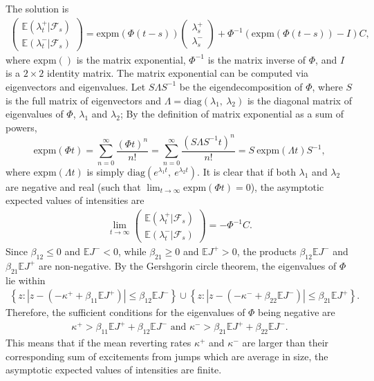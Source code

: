 \documentclass[11pt,a4paper]{article}
\numberwithin{equation}{section}
\theoremstyle{remark}
\theoremstyle{definition}
\newcommand{\E}{{\mathbb{E}}}
\begin{document}
The solution is
\begin{align*}
\begin{pmatrix}
  \E(\lambda^+_t|\mathcal{F}_s)\\
\E(\lambda^-_t|\mathcal{F}_s)
\end{pmatrix}=
\text{expm}(\Phi (t-s))
\begin{pmatrix}
  \lambda^+_s\\
  \lambda^-_s
\end{pmatrix}
+ \Phi^{-1}\left(\text{expm}(\Phi (t-s))-I\right)C,
\end{align*}
where $\text{expm}()$ is the matrix exponential,
$\Phi^{-1}$ is the matrix inverse of $\Phi$, and $I$ is a $2\times 2$ identity matrix.
The matrix exponential can be computed via eigenvectors and eigenvalues.
Let $S \Lambda S^{-1}$ be the eigendecomposition of $\Phi$,
where $S$ is the full matrix of eigenvectors and $\Lambda = \text{diag}(\lambda_1,\ \lambda_2)$ is the diagonal matrix of eigenvalues of $\Phi$, $\lambda_1$ and $\lambda_2$;
By the definition of matrix exponential as a sum of powers,
\begin{equation*}
  \text{expm}(\Phi t) = \sum_{n=0}^\infty \frac{(\Phi t)^n}{n!}
                      = \sum_{n=0}^\infty \frac{(S\Lambda S^{-1}t)^n}{n!}
                      = S\ \text{expm}(\Lambda t) S^{-1},
\end{equation*}
where $\text{expm}(\Lambda t)$ is simply $\text{diag}(e^{\lambda_1 t},\ e^{\lambda_2 t})$.
It is clear that if both $\lambda_1$ and $\lambda_2$ are negative and real (such that $\lim_{t \rightarrow \infty}\text{expm}(\Phi t)=0$), the asymptotic expected values of intensities are
\begin{align*}
\lim_{t \rightarrow \infty}
\begin{pmatrix}
  \E(\lambda^+_t|\mathcal{F}_s)\\
  \E(\lambda^-_t|\mathcal{F}_s)
\end{pmatrix}
= -\Phi^{-1}C.
\end{align*}
Since $\beta_{12}\leq0$ and $\E J^-<0$, while $\beta_{21}\geq0$ and $\E J^+>0$, the products $\beta_{12}\E J^-$ and $\beta_{21}\E J^+$ are non-negative. By the Gershgorin circle theorem, the eigenvalues of $\Phi$ lie within
\begin{align*}
  \left\{z:\left|z - (-\kappa^+ + \beta_{11}\E J^+)\right| \leq \beta_{12}\E J^-\right\} \cup
  \left\{z:\left|z - (-\kappa^- + \beta_{22}\E J^-)\right| \leq \beta_{21}\E J^+\right\}.
\end{align*}
Therefore, the sufficient conditions for the eigenvalues of $\Phi$ being negative are
\begin{align}
\kappa^+ > \beta_{11}\E J^+ + \beta_{12}\E J^- \text{ and }
\kappa^- > \beta_{21}\E J^+ + \beta_{22}\E J^-.
\end{align}
This means that if the mean reverting rates $\kappa^+$ and $\kappa^-$ are larger than their corresponding sum of excitements from jumps which are average in size,
 the asymptotic expected values of intensities are finite.
\end{document}
